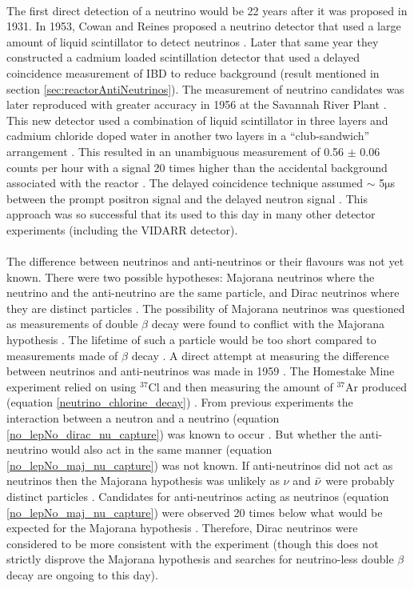\\The first direct detection of a neutrino would be 22 years after it was proposed in 1931. In 1953, Cowan and Reines proposed a neutrino detector that used a large amount of liquid scintillator to detect neutrinos \cite{reines1953proposed}. Later that same year they constructed a cadmium loaded scintillation detector that used a delayed coincidence measurement of IBD to reduce background \cite{reines1953proposed} \cite{reines1953detection} (result mentioned in section \ref{sec:reactorAntiNeutrinos}). The measurement of neutrino candidates was later reproduced with greater accuracy in 1956 at the Savannah River Plant \cite{Cowan1956Confirmation}. This new detector used a combination of liquid scintillator in three layers and cadmium chloride doped water in another two layers in a ``club-sandwich'' arrangement \cite{Cowan1956Confirmation}. This resulted in an unambiguous measurement of 0.56 $\pm$ 0.06 counts per hour with a signal 20 times higher than the accidental background associated with the reactor \cite{Cowan1956Confirmation}. The delayed coincidence technique assumed $\sim$ 5$\mathrm{\mu}$s between the prompt positron signal and the delayed neutron signal \cite{reines1953detection}. This approach was so successful that its used to this day in many other detector experiments (including the VIDARR detector).
\\\\The difference between neutrinos and anti-neutrinos or their flavours was not yet known. There were two possible hypotheses: Majorana neutrinos where the neutrino and the anti-neutrino are the same particle, and Dirac neutrinos where they are distinct particles  \cite{griffiths2008neutrino1.5} \cite{cowan1957test}. The possibility of Majorana neutrinos was questioned as measurements of double $\beta$ decay were found to conflict with the Majorana hypothesis \cite{cowan1957test}. The lifetime of such a particle would be too short compared to measurements made of $\beta$ decay \cite{cowan1957test}. A direct attempt at measuring the difference between neutrinos and anti-neutrinos was made in 1959 \cite{davis1959attempt}. The Homestake Mine experiment relied on using $^{37}$Cl and then measuring the amount of $^{37}$Ar produced (equation \ref{neutrino_chlorine_decay}) \cite{davis1959attempt}. From previous experiments the interaction between a neutron and a neutrino (equation \ref{no_lepNo_dirac_nu_capture}) was known to occur \cite{Cowan1956Confirmation}. But whether the anti-neutrino would also act in the same manner (equation \ref{no_lepNo_maj_nu_capture}) was not known. If anti-neutrinos did not act as neutrinos then the Majorana hypothesis was unlikely as $\nu$ and $\Bar{\nu}$ were probably distinct particles  \cite{griffiths2008neutrino1.5} \cite{davis1959attempt}. Candidates for anti-neutrinos acting as neutrinos (equation \ref{no_lepNo_maj_nu_capture}) were observed 20 times below what would be expected for the Majorana hypothesis \cite{davis1959attempt}. Therefore, Dirac neutrinos were considered to be more consistent with the experiment (though this does not strictly disprove the Majorana hypothesis \cite{griffiths2008neutrino1.5} and searches for neutrino-less double $\beta$ decay are ongoing to this day). 

